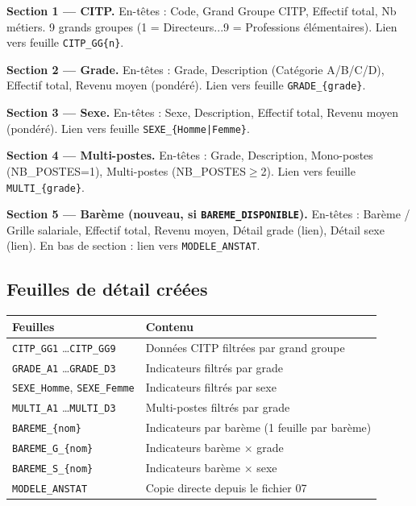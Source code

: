 \documentclass[12pt,a4paper,french]{report}
\begin{document}
\textbf{Section 1 — CITP.}
En-têtes : Code, Grand Groupe CITP, Effectif total, Nb métiers.
9 grands groupes (1 = Directeurs...9 = Professions élémentaires).
Lien vers feuille \texttt{CITP\_GG\{n\}}.

\textbf{Section 2 — Grade.}
En-têtes : Grade, Description (Catégorie A/B/C/D), Effectif total,
Revenu moyen (pondéré). Lien vers feuille \texttt{GRADE\_\{grade\}}.

\textbf{Section 3 — Sexe.}
En-têtes : Sexe, Description, Effectif total, Revenu moyen (pondéré).
Lien vers feuille \texttt{SEXE\_\{Homme|Femme\}}.

\textbf{Section 4 — Multi-postes.}
En-têtes : Grade, Description, Mono-postes (NB\_POSTES=1),
Multi-postes (NB\_POSTES$\geq$2). Lien vers feuille
\texttt{MULTI\_\{grade\}}.

\textbf{Section 5 — Barème (nouveau, si \texttt{BAREME\_DISPONIBLE}).}
En-têtes : Barème / Grille salariale, Effectif total, Revenu moyen,
Détail grade (lien), Détail sexe (lien).
En bas de section : lien vers \texttt{MODELE\_ANSTAT}.

\subsection{Feuilles de détail créées}

\begin{tabularx}{\textwidth}{lX}
  \toprule
  \textbf{Feuilles} & \textbf{Contenu} \\
  \midrule
  \texttt{CITP\_GG1} \ldots \texttt{CITP\_GG9} &
    Données CITP filtrées par grand groupe \\
  \texttt{GRADE\_A1} \ldots \texttt{GRADE\_D3} &
    Indicateurs filtrés par grade \\
  \texttt{SEXE\_Homme}, \texttt{SEXE\_Femme} &
    Indicateurs filtrés par sexe \\
  \texttt{MULTI\_A1} \ldots \texttt{MULTI\_D3} &
    Multi-postes filtrés par grade \\
  \texttt{BAREME\_\{nom\}} &
    Indicateurs par barème (1 feuille par barème) \\
  \texttt{BAREME\_G\_\{nom\}} &
    Indicateurs barème $\times$ grade \\
  \texttt{BAREME\_S\_\{nom\}} &
    Indicateurs barème $\times$ sexe \\
  \texttt{MODELE\_ANSTAT} &
    Copie directe depuis le fichier 07 \\
  \bottomrule
\end{tabularx}
\end{document}
